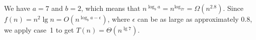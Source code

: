 We have $a=7$ and $b=2$, which means that $n^{\log_ba}=n^{\log_27}=\Omega(n^{2.8})$.
Since $f(n)=n^2\lg n=O(n^{\log_ba-\epsilon})$, where $\epsilon$ can be as large as approximately $0.8$, we apply case~1 to get $T(n)=\Theta(n^{\lg7})$.
